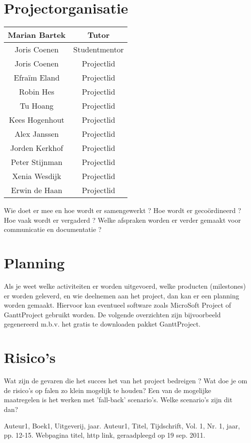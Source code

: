 \documentclass[11pt,twoside,a4paper]{article}
\begin{document}
\section{Projectorganisatie}
\begin {tabular}{|c|c|}
\hline
Marian Bartek & Tutor\\
\hline
Joris Coenen & Studentmentor\\
\hline
Joris Coenen & Projectlid\\
\hline
Efraïm Eland & Projectlid\\
\hline
Robin Hes & Projectlid\\
\hline
Tu Hoang & Projectlid\\
\hline
Kees Hogenhout & Projectlid\\
\hline
Alex Janssen & Projectlid\\
\hline
Jorden Kerkhof & Projectlid\\
\hline
Peter Stijnman & Projectlid\\
\hline
Xenia Wesdijk & Projectlid\\
\hline
Erwin de Haan & Projectlid\\
\hline


\end {tabular}

Wie doet er mee en hoe wordt er samengewerkt ?  Hoe wordt er gecoördineerd ?  Hoe vaak wordt er vergaderd ?  Welke afspraken worden er verder gemaakt voor communicatie en documentatie ?
\section{Planning}
Als je weet welke activiteiten er worden uitgevoerd, welke producten (milestones) er worden geleverd, en wie deelnemen aan het project, dan kan er een planning worden gemaakt. Hiervoor kan eventueel software zoals MicroSoft Project of GanttProject gebruikt worden.  De volgende overzichten zijn bijvoorbeeld gegenereerd m.b.v. het gratis te downloaden pakket GanttProject.



\section{Risico's}
Wat zijn de gevaren die het succes het van het project bedreigen ? Wat doe je om de risico's op falen zo klein mogelijk te houden? Een van de mogelijke maatregelen is het werken met 'fall-back' scenario’s. Welke scenario's zijn dit dan?


\begin{thebibliography}{9}
Auteur1, 
Boek1, 
Uitgeverij, 
jaar.
Auteur1, 
Titel, 
Tijdschrift, 
Vol. 1, 
Nr. 1, 
jaar, 
pp. 12-15.
Webpagina titel, 
http link, 
geraadpleegd op 19 sep. 2011.
\end{thebibliography}
\end{document}
